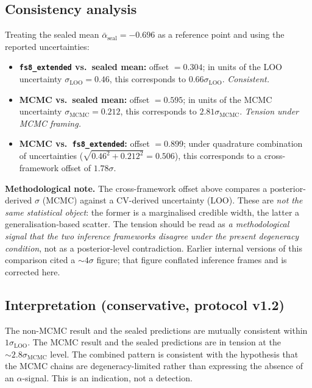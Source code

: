 \documentclass[11pt,a4paper]{article}
\begin{document}
\subsection{Consistency analysis}

Treating the sealed mean $\bar\alpha_{\mathrm{seal}} = -0.696$ as a reference point and using the reported uncertainties:

\begin{itemize}[leftmargin=18pt,itemsep=2pt]
  \item \textbf{\texttt{fs8\_extended} vs.\ sealed mean:} offset $= 0.304$; in units of the LOO uncertainty $\sigma_{\mathrm{LOO}} = 0.46$, this corresponds to $0.66\sigma_{\mathrm{LOO}}$. \emph{Consistent.}
  \item \textbf{MCMC vs.\ sealed mean:} offset $= 0.595$; in units of the MCMC uncertainty $\sigma_{\mathrm{MCMC}} = 0.212$, this corresponds to $2.81\sigma_{\mathrm{MCMC}}$. \emph{Tension under MCMC framing.}
  \item \textbf{MCMC vs.\ \texttt{fs8\_extended}:} offset $= 0.899$; under quadrature combination of uncertainties ($\sqrt{0.46^2 + 0.212^2} = 0.506$), this corresponds to a cross-framework offset of $1.78\sigma$.
\end{itemize}

\begin{warnbox}
\textbf{Methodological note.} The cross-framework offset above compares a posterior-derived $\sigma$ (MCMC) against a CV-derived uncertainty (LOO). These are \emph{not the same statistical object}: the former is a marginalised credible width, the latter a generalisation-based scatter. The tension should be read as \emph{a methodological signal that the two inference frameworks disagree under the present degeneracy condition}, not as a posterior-level contradiction. Earlier internal versions of this comparison cited a $\sim 4\sigma$ figure; that figure conflated inference frames and is corrected here.
\end{warnbox}

\subsection{Interpretation (conservative, protocol v1.2)}

The non-MCMC result and the sealed predictions are mutually consistent within $1\sigma_{\mathrm{LOO}}$. The MCMC result and the sealed predictions are in tension at the $\sim 2.8\sigma_{\mathrm{MCMC}}$ level. The combined pattern is consistent with the hypothesis that the MCMC chains are degeneracy-limited rather than expressing the absence of an $\alpha$-signal. This is an indication, not a detection.
\end{document}
